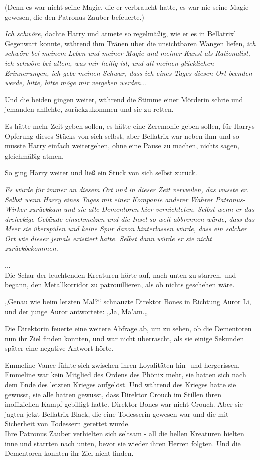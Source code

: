 {(Denn es war nicht seine Magie, die er verbraucht hatte, es war nie seine Magie gewesen, die den Patronus-Zauber befeuerte.)

\emph{Ich schwöre,} dachte Harry und atmete so regelmäßig, wie er es in Bellatrix' Gegenwart konnte, während ihm Tränen über die unsichtbaren Wangen liefen, \emph{ich schwöre bei meinem Leben und meiner Magie und meiner Kunst als Rationalist, ich schwöre bei allem, was mir heilig ist, und all meinen glücklichen Erinnerungen, ich gebe meinen Schwur, dass ich eines Tages diesen Ort beenden werde, bitte, bitte möge mir vergeben werden.}..

Und die beiden gingen weiter, während die Stimme einer Mörderin schrie und jemanden anflehte, zurückzukommen und sie zu retten.

Es hätte mehr Zeit geben sollen, es hätte eine Zeremonie geben sollen, für Harrys Opferung dieses Stücks von sich selbst, aber Bellatrix war neben ihm und so musste Harry einfach weitergehen, ohne eine Pause zu machen, nichts sagen, gleichmäßig atmen.

So ging Harry weiter und ließ ein Stück von sich selbst zurück.

\emph{Es würde für immer an diesem Ort und in dieser Zeit verweilen, das wusste er. Selbst wenn Harry eines Tages mit einer Kompanie anderer Wahrer Patronus-Wirker zurückkam und sie alle Dementoren hier vernichteten. Selbst wenn er das dreieckige Gebäude einschmelzen und die Insel so weit abbrennen würde, dass das Meer sie überspülen und keine Spur davon hinterlassen würde, dass ein solcher Ort wie dieser jemals existiert hatte. Selbst dann würde er sie nicht zurückbekommen.}

...\\ Die Schar der leuchtenden Kreaturen hörte auf, nach unten zu starren, und begann, den Metallkorridor zu patrouillieren, als ob nichts geschehen wäre.

„Genau wie beim letzten Mal?“ schnauzte Direktor Bones in Richtung Auror Li, und der junge Auror antwortete: „Ja, Ma'am.„

Die Direktorin feuerte eine weitere Abfrage ab, um zu sehen, ob die Dementoren nun ihr Ziel finden konnten, und war nicht überrascht, als sie einige Sekunden später eine negative Antwort hörte.

Emmeline Vance fühlte sich zwischen ihren Loyalitäten hin- und hergerissen. Emmeline war kein Mitglied des Ordens des Phönix mehr, sie hatten sich nach dem Ende des letzten Krieges aufgelöst. Und während des Krieges hatte sie gewusst, sie alle hatten gewusst, dass Direktor Crouch im Stillen ihren inoffiziellen Kampf gebilligt hatte. Direktor Bones war nicht Crouch. Aber sie jagten jetzt Bellatrix Black, die eine Todesserin gewesen war und die mit Sicherheit von Todessern gerettet wurde.\\ Ihre Patronus Zauber verhielten sich seltsam - all die hellen Kreaturen hielten inne und starrten nach unten, bevor sie wieder ihren Herren folgten. Und die Dementoren konnten ihr Ziel nicht finden.

}
